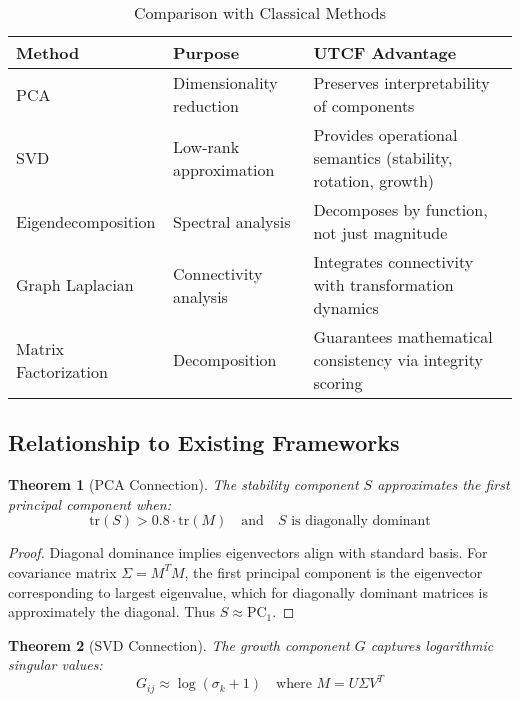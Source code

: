 \documentclass[11pt,a4paper]{article}
\newtheorem{theorem}{Theorem}[section]
\theoremstyle{definition}
\theoremstyle{remark}
\newcommand{\trace}{\text{tr}}
\begin{document}
\begin{table}[h]
\centering
\small
\begin{tabular}{llp{5cm}}
\toprule
\textbf{Method} & \textbf{Purpose} & \textbf{UTCF Advantage} \\
\midrule
PCA & Dimensionality reduction & Preserves interpretability of components \\
SVD & Low-rank approximation & Provides operational semantics (stability, rotation, growth) \\
Eigendecomposition & Spectral analysis & Decomposes by function, not just magnitude \\
Graph Laplacian & Connectivity analysis & Integrates connectivity with transformation dynamics \\
Matrix Factorization & Decomposition & Guarantees mathematical consistency via integrity scoring \\
\bottomrule
\end{tabular}
\caption{Comparison with Classical Methods}
\label{tab:comparison}
\end{table}

\subsection{Relationship to Existing Frameworks}

\begin{theorem}[PCA Connection]\label{thm:pca}
The stability component $S$ approximates the first principal component when:
\begin{equation}
\trace(S) > 0.8 \cdot \trace(M) \quad \text{and} \quad S \text{ is diagonally dominant}
\end{equation}
\end{theorem}

\begin{proof}
Diagonal dominance implies eigenvectors align with standard basis. For covariance matrix $\Sigma = M^T M$, the first principal component is the eigenvector corresponding to largest eigenvalue, which for diagonally dominant matrices is approximately the diagonal. Thus $S \approx \text{PC}_1$.
\end{proof}

\begin{theorem}[SVD Connection]\label{thm:svd}
The growth component $G$ captures logarithmic singular values:
\begin{equation}
G_{ij} \approx \log(\sigma_k + 1) \quad \text{where } M = U \Sigma V^T
\end{equation}
\end{theorem}
\end{document}
